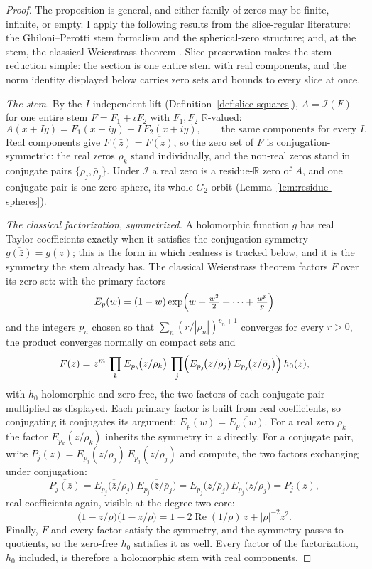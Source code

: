 \documentclass[11pt]{article}
\newcommand{\RR}{\mathbb{R}}
\theoremstyle{plain}
\theoremstyle{definition}
\theoremstyle{remark}
\begin{document}
\begin{proof}
The proposition is general, and either family of zeros may be finite,
infinite, or empty. I apply the following results from the slice-regular
literature: the Ghiloni--Perotti stem formalism and the spherical-zero
structure; and, at the stem, the classical Weierstrass theorem
\cite[Ch.~VII, \S5]{Conway78}. Slice preservation makes the stem
reduction simple: the section is one entire stem with real components,
and the norm identity displayed below carries zero sets and bounds to
every slice at once.

\emph{The stem.} By the $I$-independent lift
(Definition~\ref{def:slice-squares}), $A=\mathcal I(F)$ for one entire stem
$F=F_1+\iota F_2$ with $F_1,F_2$ $\RR$-valued:
\[
  A(x+Iy)=F_1(x+iy)+I\,F_2(x+iy),\qquad
  \text{the same components for every }I.
\]
Real components give $F(\bar z)=\overline{F(z)}$, so the zero set of $F$ is
conjugation-symmetric: the real zeros $\rho_k$ stand individually, and the
non-real zeros stand in conjugate pairs $\{\rho_j,\bar\rho_j\}$. Under
$\mathcal I$ a real zero is a residue-$\RR$ zero of $A$, and one conjugate
pair is one zero-sphere, its whole $G_2$-orbit (Lemma~\ref{lem:residue-spheres}).

\emph{The classical factorization, symmetrized.} A holomorphic function $g$
has real Taylor coefficients exactly when it satisfies the conjugation
symmetry $\overline{g(\bar z)}=g(z)$; this is the form in which realness is
tracked below, and it is the symmetry the stem already has. The classical
Weierstrass theorem \cite[Ch.~VII, \S5]{Conway78} factors $F$ over its
zero set: with the primary factors
\[
  E_p(w)=(1-w)\exp\Bigl(w+\tfrac{w^2}{2}+\dots+\tfrac{w^p}{p}\Bigr)
\]
and the integers $p_n$ chosen so that $\sum_n(r/|\rho_n|)^{p_n+1}$ converges
for every $r>0$, the product converges normally on compact sets and
\[
  F(z)=z^{m}\,\prod_{k}E_{p_k}\!\bigl(z/\rho_k\bigr)\,
       \prod_{j}\Bigl(E_{p_j}\!\bigl(z/\rho_j\bigr)\,
                     E_{p_j}\!\bigl(z/\bar\rho_j\bigr)\Bigr)\,h_0(z),
\]
with $h_0$ holomorphic and zero-free, the two factors of each conjugate pair
multiplied as displayed. Each
primary factor is built from real coefficients, so conjugating it conjugates
its argument: $E_p(\bar w)=\overline{E_p(w)}$. For a real zero $\rho_k$ the
factor $E_{p_k}(z/\rho_k)$ inherits the symmetry in $z$ directly. For a
conjugate pair, write $P_j(z)=E_{p_j}(z/\rho_j)\,E_{p_j}(z/\bar\rho_j)$ and
compute, the two factors exchanging under conjugation:
\[
  \overline{P_j(\bar z)}
    =\overline{E_{p_j}\!\bigl(\bar z/\rho_j\bigr)}\;
     \overline{E_{p_j}\!\bigl(\bar z/\bar\rho_j\bigr)}
    =E_{p_j}\!\bigl(z/\bar\rho_j\bigr)\,E_{p_j}\!\bigl(z/\rho_j\bigr)
    =P_j(z),
\]
real coefficients again, visible at the degree-two core:
\[
  \bigl(1-z/\rho\bigr)\bigl(1-z/\bar\rho\bigr)
    =1-2\operatorname{Re}(1/\rho)\,z+|\rho|^{-2}z^{2}.
\]
Finally, $F$ and every factor satisfy the symmetry, and the symmetry
passes to quotients, so the zero-free $h_0$ satisfies it as well. Every factor
of the factorization, $h_0$ included, is therefore a holomorphic stem with real
components.


\end{proof}
\end{document}
